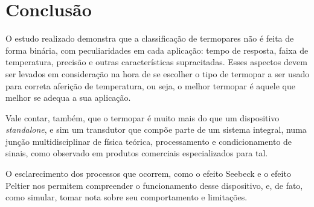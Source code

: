 \documentclass[a4paper,12pt]{report}
\begin{document}
\newpage

	\chapter{Conclusão}
	O estudo realizado demonstra que a classificação de termopares não é feita de forma binária, com peculiaridades em cada aplicação: tempo de resposta, faixa de temperatura, precisão e outras características supracitadas. Esses aspectos devem ser levados em consideração na hora de se escolher o tipo de termopar a ser usado para correta aferição de temperatura, ou seja, o melhor termopar é aquele que melhor se adequa a sua aplicação. 
	
	Vale contar, também, que o termopar é muito mais do que um dispositivo \textit{standalone}, e sim um transdutor que compõe parte de um sistema integral, numa junção multidisciplinar de física teórica, processamento e condicionamento de sinais, como observado em produtos comerciais especializados para tal.
	
	O esclarecimento dos processos que ocorrem, como o efeito Seebeck e o efeito Peltier nos permitem compreender o funcionamento desse dispositivo, e, de fato, como simular, tomar nota sobre seu comportamento e limitações.
	
	\nocite{*}
	

	
	
	
\end{document}
